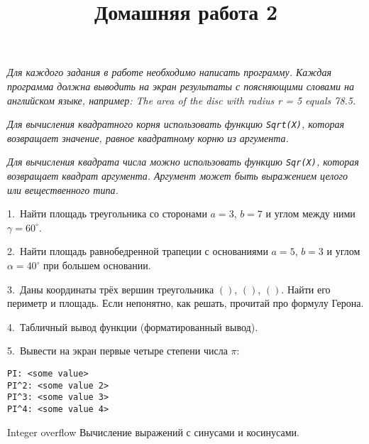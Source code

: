 \documentclass[12pt,russian,draft]{article}
\title{Домашняя работа 2}
\date{}
\begin{document}
\maketitle{}

\emph{Для каждого задания в работе необходимо написать программу. Каждая
    программа должна выводить на экран результаты с поясняющими словами на
    английском языке, например: The area of the disc with radius r = 5 equals
    78.5.}

\emph{Для вычисления квадратного корня использовать функцию \texttt{Sqrt(X)},
    которая возвращает значение, равное квадратному корню из аргумента.}

\emph{Для вычисления квадрата числа можно использовать функцию \texttt{Sqr(X)},
    которая возвращает квадрат аргумента. Аргумент может быть выражением целого
    или вещественного типа.}

1.\ Найти площадь треугольника со сторонами $ a = 3 $, $ b = 7 $ и углом между
ними $ \gamma = 60^{\circ} $.

2.\ Найти площадь равнобедренной трапеции с основаниями $ a = 5 $, $ b = 3 $ и
углом $ \alpha = 40^{\circ} $ при большем основании.

3.\ Даны координаты трёх вершин треугольника $ () $, $ () $, $ () $. Найти его
периметр и площадь. Если непонятно, как решать, прочитай про формулу Герона.

4.\ Табличный вывод функции (форматированный вывод).

5.\ Вывести на экран первые четыре степени числа $ \pi $:
\begin{lstlisting}
PI: <some value>
PI^2: <some value 2>
PI^3: <some value 3>
PI^4: <some value 4>
\end{lstlisting}

Integer overflow
Вычисление выражений с синусами и косинусами.
\end{document}
